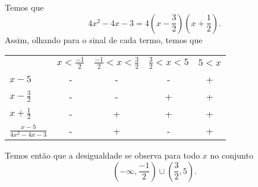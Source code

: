 Temos que
\[
	4x^2-4x-3=4\left(x-\frac{3}{2}\right)\left(x+\frac{1}{2}\right).
\]
Assim, olhando para o sinal de cada termo, temos que

\begin{tabular}{lcccc}
				& $x<\frac{-1}{2}$ & $\frac{-1}{2}<x<\frac{3}{2}$ & $\frac{3}{2}<x<5$ & $5<x$ \\
$x-5$			& -				   & -							  & -				  & + \\
$x-\frac{3}{2}$	& -				   & -							  & +				  & + \\
$x+\frac{1}{2}$ & -				   & +							  & +				  & + \\
$\frac{x-5}{4x^2-4x-3}$ & -		   & +							  & -				  & +
\end{tabular}

Temos então que a desigualdade se observa para todo $x$ no conjunto
\[
	\left(-\infty,\frac{-1}{2}\right)\cup\left(\frac{3}{2},5\right).
\]

